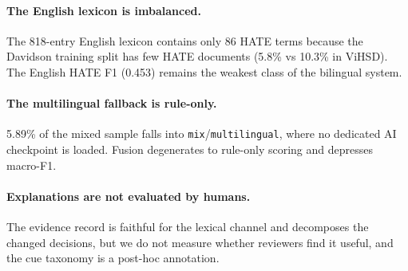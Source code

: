\paragraph{The English lexicon is imbalanced.}  The 818-entry English lexicon
contains only 86 HATE terms because the Davidson training split has few HATE
documents (5.8\% vs 10.3\% in ViHSD).  The English HATE F1 (0.453) remains the
weakest class of the bilingual system.

\paragraph{The multilingual fallback is rule-only.}  5.89\% of the mixed sample
falls into \texttt{mix}/\texttt{multilingual}, where no dedicated AI checkpoint
is loaded.  Fusion degenerates to rule-only scoring and depresses macro-F1.

\paragraph{Explanations are not evaluated by humans.}  The evidence record is
faithful for the lexical channel and decomposes the changed decisions, but we
do not measure whether reviewers find it useful, and the cue taxonomy is a
post-hoc annotation.
